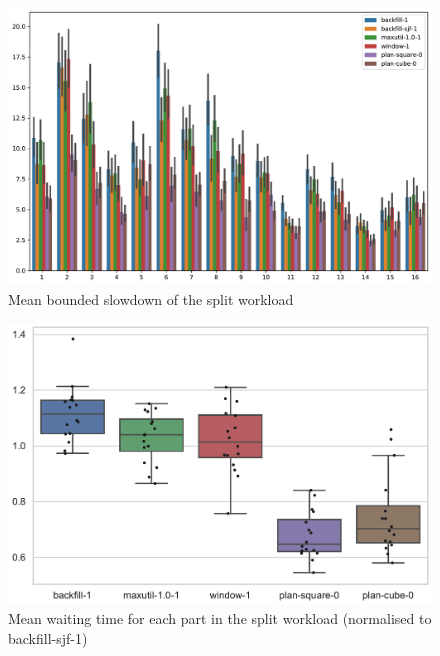 \documentclass[thesis-en.tex]{subfiles}
\begin{document}
\begin{figure}[p]
    \centering
    \includegraphics[width=\textwidth]{best_alloc-only_parts_bounded-slowdown.pdf}
    \caption{Mean bounded slowdown of the split workload}
    \label{fig:best_alloc-only_parts_bounded-slowdown}
\end{figure}

\begin{figure}[p]
    \centering
    \includegraphics[width=\textwidth]{best_alloc-only_parts_waiting-time_box.pdf}
    \caption{Mean waiting time for each part in the split workload (normalised to backfill-sjf-1)}
    \label{fig:best_alloc-only_parts_waiting-time_box}
\end{figure}
\end{document}
